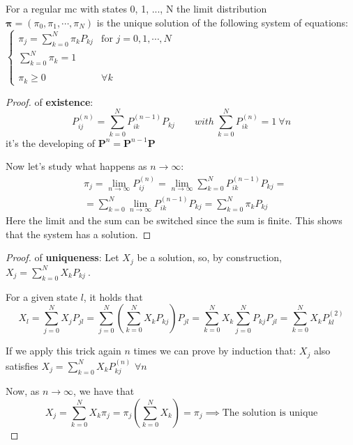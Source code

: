 	\begin{theorem}
		For a regular \gls{mc} with states 0, 1, ..., N the limit distribution $\bm\pi = (\pi_0,\pi_1,\cdots,\pi_N)$ is the unique solution of the following system of equations:\\

		$\begin{cases}
			\pi_j = \sum\limits_{k=0}^N \pi_k P_{k j} & \text{for } j = 0,1, \cdots, N \\
			\sum\limits_{k=0}^N \pi_k = 1\\
			\\ \pi_k \ge 0 & \forall k
		\end{cases}$
	\end{theorem}

	\begin{proof} of \textbf{existence}:
		\begin{equation}
  			P_{i j}^{(n)} = \sum\limits_{k=0}^N P_{ik}^{(n-1)} P_{k j}
			\qquad with ~\sum\limits_{k=0}^N P_{ik}^{(n)} = 1 ~\forall n
		\end{equation}
		it's the developing of $\bm P^n = \bm P^{n-1} \bm P$

		Now let's study what happens as $ n \to \infty $:
		\begin{equation}
			\begin{split}
				&\pi_j = \lim_{n \to \infty} P_{ij}^{(n)} = \lim_{n \to \infty} \sum\limits_{k=0}^N P_{ik}^{(n-1)} P_{k j
				} =\\
				&= \sum\limits_{k=0}^N \lim_{n \to \infty} P_{ik}^{(n-1)} P_{k j
				} = \sum\limits_{k=0}^N \pi_k P_{kj}
			\end{split}
		\end{equation}
		Here the limit and the sum can be switched since the sum is finite.
		This shows that the system has a solution.
	\end{proof}

	\begin{proof} of \textbf{uniqueness}:
		Let $X_j$ be a solution, so, by construction, $X_j = \sum\limits_{k=0}^N X_k P_{kj} ~$.

		For a given state $l$, it holds that
		\begin{equation}
				X_l = \sum\limits_{j=0}^N X_j P_{jl} =  \sum\limits_{j=0}^N \left( \sum\limits_{k=0}^N X_k P_{kj} \right) P_{jl} =  \sum\limits_{k=0}^N X_k \sum\limits_{j=0}^N P_{kj} P_{jl} = \sum\limits_{k=0}^N X_k P_{kl}^{(2)}
		\end{equation}

		If we apply this trick again $n$ times we can prove by induction that:
		$X_j$ also satisfies $ X_j = \sum\limits_{k=0}^N X_k P_{kj}^{(n)} $ \quad  $\forall n $

		Now, as $n \to \infty$, we have that
		\begin{equation}
			X_j = \sum\limits_{k=0}^N X_k \pi_j = \pi_j \left(\sum\limits_{k=0}^N X_k\right) = \pi_j  \implies
			\text{The solution is unique}
		\end{equation}
	\end{proof}

